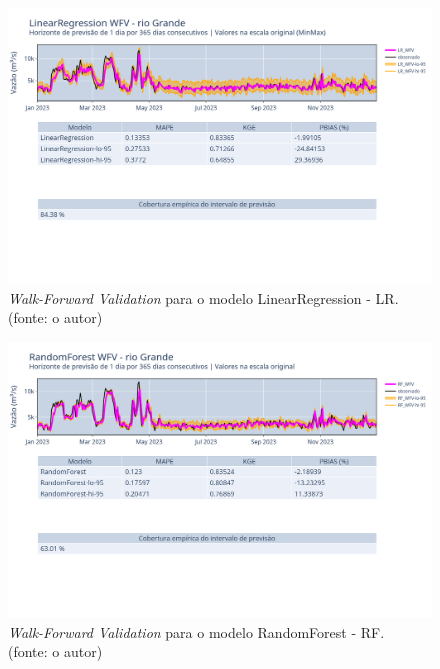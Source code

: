 \begin{figure}[!h]
	\centering
	\includegraphics[scale=0.33]{Figuras/rio_grande/wfv/LR/LR_WFV_ORIG.png}
	\caption{\textit{Walk-Forward Validation} para o modelo LinearRegression - LR.\\(fonte: o autor)}
	\label{fig:grande_LR_WFV_ORIG}
\end{figure}

\begin{figure}[!h]
	\centering
	\includegraphics[scale=0.33]{Figuras/rio_grande/wfv/RF/RF_WFV_ORIG.png}
	\caption{\textit{Walk-Forward Validation} para o modelo RandomForest - RF.\\(fonte: o autor)}
	\label{fig:grande_RF_WFV_ORIG}
\end{figure}
\clearpage

